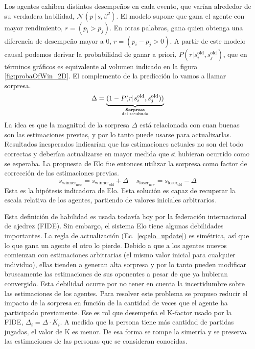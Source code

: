 \documentclass[a4paper,10pt]{book}
\newcommand{\N}{\mathcal{N}}
\newcommand\hfrac[2]{\genfrac{}{}{0pt}{}{#1}{#2}} %
\theoremstyle{definition}
\begin{document}
%
Los agentes exhiben distintos desempe\~nos en cada evento, que var\'ian alrededor de su verdadera habilidad, $\N(p\,|\,s,\beta^2)$.
%
El modelo supone que gana el agente con mayor rendimiento, $r = (p_i > p_j)$.
%
En otras palabras, gana quien obtenga una diferencia de desempe\~no mayor a 0, $r = (p_i - p_j > 0)$.
%
A partir de este modelo causal podemos derivar la probabilidad de ganar a priori, $P(r|s_i^{\text{old}},s_j^{\text{old}})$, que en términos gráficos es equivalente al volumen indicado en la figura \ref{fig:probaOfWin_2D}.
%
El complemento de la predicci\'on lo vamos a llamar sorpresa.
%
\begin{equation*}
 \Delta = \underbrace{(1 - P(r|s_i^{\text{old}},s_j^{\text{old}}))}_{\hfrac{\textbf{Sorpresa}}{\text{del resultado}}}
\end{equation*}
%
La idea es que la magnitud de la sorpresa $\Delta$ est\'a relacionada con cuan buenas son las estimaciones previas, y por lo tanto puede usarse para actualizarlas.
%
Resultados inesperados indicar\'ian que las estimaciones actuales no son del todo correctas y deber\'ian actualizarse en mayor medida que si hubieran ocurrido como se esperaba.
%
La propuesta de Elo fue entonces utilizar la sorpresa como factor de correcci\'on de las estimaciones previas.
%
\begin{equation}\label{eq:elo_update}
 s_{\text{winner}_\text{new}} = s_{\text{winner}_\text{old}} + \Delta \ \ \ \ \ s_{\text{loser}_\text{new}} = s_{\text{loser}_\text{old}} - \Delta 
\end{equation}
%
Esta es la hip\'otesis indicadora de Elo.
%
Esta soluci\'on es capaz de recuperar la escala relativa de los agentes, partiendo de valores iniciales arbitrarios.
%
\begin{center}
\end{center}
%
Esta definici\'on de habilidad es usada todav\'ia hoy por la federaci\'on internacional de ajedrez (FIDE).
%
Sin embargo, el sistema Elo tiene algunas debilidades importantes.
%
La regla de actualizaci\'on (Ec.~\eqref{eq:elo_update}) es sim\'etrica, as\'i que lo que gana un agente el otro lo pierde.
%
Debido a que a los agentes nuevos comienzan con estimaciones arbitrarias (el mismo valor inicial para cualquier individuo), ellas tienden a generan alta sorpresa y por lo tanto pueden modificar bruscamente las estimaciones de sus oponentes a pesar de que ya hubieran convergido.
%
Esta debilidad ocurre por no tener en cuenta la incertidumbre sobre las estimaciones de los agentes.
%
Para resolver este problema se propuso reducir el impacto de la sorpresa en funci\'on de la cantidad de veces que el agente ha participado previamente.
%
Ese es rol que desempe\~na el K-factor usado por la FIDE, $\Delta_i = \Delta \cdot K_i$.
%
A medida que la persona tiene más cantidad de partidas jugadas, el valor de K es menor.
%
De esa forma se rompe la simetr\'ia y se preserva las estimaciones de las personas que se consideran conocidas.
\end{document}
